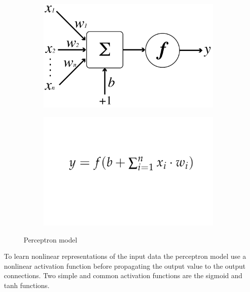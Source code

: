 \documentclass[../main.tex]{subfiles}
\begin{document}
\bigskip
\bigskip
\begin{figure}[h!]
  \centering
  \begin{subfigure}[]{0.4\textwidth}
    \includegraphics[width=\linewidth]{images/Perceptron.png}
  \end{subfigure}
  \begin{subfigure}[]{0.4\textwidth}
    \includegraphics[width=\linewidth]{images/PerceptronFormula.png}
  \end{subfigure}
  \caption{Perceptron model}
  \label{fig:Perceptron}
\end{figure}

\newpage
To learn nonlinear representations of the input data the perceptron model use a nonlinear activation function before propagating the output value to the output connections. Two simple and common activation functions are the sigmoid and tanh functions.
\end{document}
